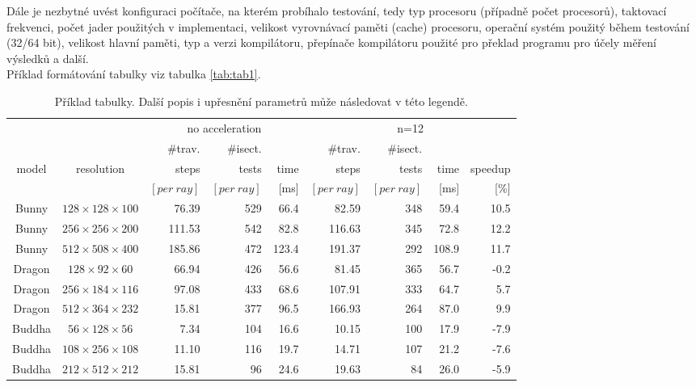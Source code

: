 \documentclass[report,11pt]{elsarticle}
\begin{document}
Dále je nezbytné uvést konfiguraci počítače, na kterém probíhalo
testování, tedy typ procesoru (případně počet procesorů), taktovací
frekvenci, počet jader použitých v implementaci, velikost vyrovnávací
paměti (cache) procesoru, operační systém použitý během testování
(32/64 bit), velikost hlavní paměti, typ a verzi kompilátoru,
přepínače kompilátoru použité pro překlad programu pro účely měření
výsledků a další.\\

Příklad formátování tabulky viz tabulka \ref{tab:tab1}.

\begin{table}[t]\footnotesize
\begin{center}
\begin{tabular}{| c | c || r | r | r || r | r | r | r |}
\hline
          &               &   \multicolumn{3}{c||}{no acceleration}     &   \multicolumn{4}{c|}{n=12}  \\
\cline{3-9}
          &                 & \#trav. & \#isect. &      & \#trav. & \#isect. &  & \\
model & resolution &  steps    &    tests   & time  & steps    &    tests   & time   &  speedup \\
          &                  & $[per~ray]$ &  $ [per~ray]$   & [ms]  &$ [per~ray]$    &   $[per~ray]$   & [ms]  & [\%]  \\
\hline
\hline
Bunny & $128\times128\times100$ & 76.39 & 529 & 66.4 & 82.59 &  348 & 59.4 & 10.5 \\ \hline
Bunny & $256\times256\times200$ & 111.53 & 542 & 82.8 & 116.63 &  345 & 72.8 & 12.2 \\ \hline
Bunny & $512\times508\times400$ & 185.86 & 472 & 123.4 & 191.37 &  292 & 108.9 & 11.7 \\ \hline
Dragon & $128\times92\times60$ & 66.94 & 426 & 56.6 & 81.45 &  365 & 56.7 & -0.2 \\ \hline
Dragon & $256\times184\times116$ & 97.08 & 433 & 68.6 & 107.91 &  333 & 64.7 & 5.7 \\ \hline
Dragon &  $512\times364\times232$ & 15.81 & 377 & 96.5 & 166.93 &  264 & 87.0 & 9.9 \\ \hline
Buddha & $56\times128\times56$ & 7.34 & 104 & 16.6 & 10.15 &  100 & 17.9 & -7.9 \\ \hline
Buddha & $108\times256\times108$ & 11.10 & 116 & 19.7 & 14.71 &  107 & 21.2 & -7.6 \\ \hline
Buddha & $212\times512\times212$ & 15.81 & 96 & 24.6 & 19.63 &  84 & 26.0 & -5.9 \\ \hline
\end{tabular}
\end{center}
\vspace*{0mm}
\caption{{\label{tab:tab1}}Příklad tabulky. Další popis i upřesnění
  parametrů může následovat v této legendě.}
\vspace*{0mm}
\label{shadowtable}
\end{table}
\end{document}

